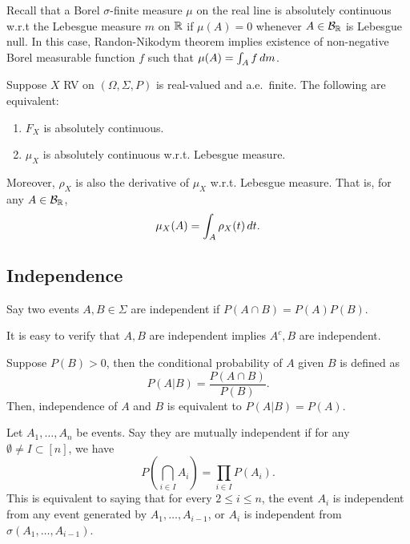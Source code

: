 \documentclass[a4paper]{article}
\begin{document}
\begin{remark}
  Recall that a Borel $\sigma$-finite measure $\mu$ on the real line
  is absolutely continuous w.r.t the Lebesgue measure $m$ on $\mathbb{R}$ if
  $\mu (A) = 0$ whenever $A \in \mathcal{B}_{\mathbb{R}}$ is Lebesgue null.
  In this case, Randon-Nikodym theorem implies existence of non-negative
  Borel measurable function $f$ such that $\mu (A) = \int_A f \, d m$.
\end{remark}

\begin{thm}
  Suppose $X$ RV on $(\Omega, \Sigma, P)$ is real-valued and a.e.\ finite.
  The following are equivalent:
  \begin{enumerate}
    \item $F_X$ is absolutely continuous.
    \item $\mu_X$ is absolutely continuous w.r.t. Lebesgue measure.
  \end{enumerate}
  Moreover, $\rho_X$ is also the derivative of $\mu_X$ w.r.t. Lebesgue
  measure. That is, for any $A \in \mathcal{B}_{\mathbb{R}}$,
  \[
    \mu_X (A) = \int_A \rho_X (t) \, d t.
  \]
\end{thm}

\subsection{Independence}

\begin{defi}
  Say two events $A, B \in \Sigma$ are independent if
  $P (A \cap B) = P (A) P (B)$.
\end{defi}

It is easy to verify that $A, B$ are independent implies
$A^c, B$ are independent.

\begin{remark}
  Suppose $P (B) > 0$, then the conditional probability of $A$
  given $B$ is defined as
  \[
    P (A | B) = \frac{P (A \cap B)}{P (B)}.
  \]
  Then, independence of $A$ and $B$ is equivalent to
  $P (A | B) = P (A)$.
\end{remark}

\begin{defi}
  Let $A_1, \dots, A_n$ be events. Say they are mutually independent
  if for any $\emptyset \neq I \subset [n]$, we have
  \[
    P \left( \bigcap_{i \in I} A_i \right) = \prod_{i \in I} P (A_i).
  \]
  This is equivalent to saying that for every $2 \leq i \leq n$,
  the event $A_i$ is independent from any event generated by
  $A_1, \dots, A_{i - 1}$, or $A_i$ is independent from
  $\sigma \left( A_1, \dots, A_{i - 1} \right)$.
\end{defi}
\end{document}
